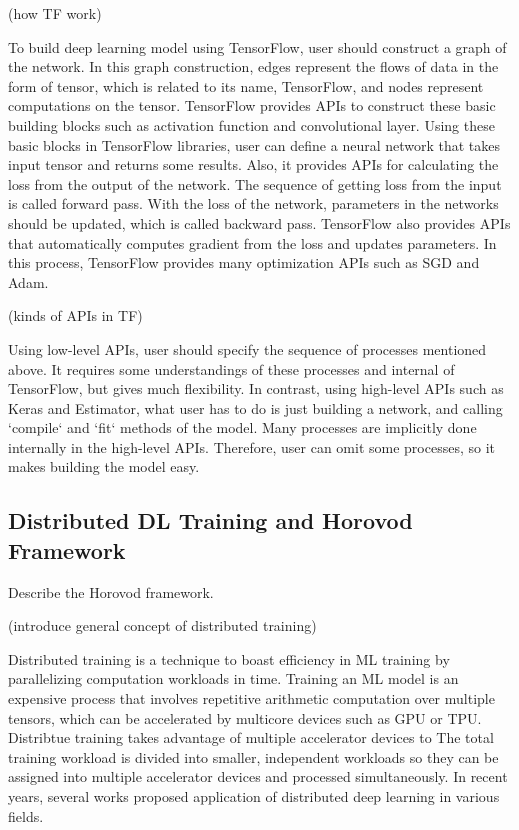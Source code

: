 (how TF work\cite{doi:10.3102/1076998619872761})

To build deep learning model using TensorFlow,
user should construct a graph of the network.
In this graph construction, edges represent the flows of data in the form of tensor,
which is related to its name, TensorFlow,
and nodes represent computations on the tensor.
TensorFlow provides APIs to construct these basic building blocks
such as activation function and convolutional layer.
Using these basic blocks in TensorFlow libraries, user can define a neural network
that takes input tensor and returns some results.
Also, it provides APIs for calculating the loss from the output of the network.
The sequence of getting loss from the input is called forward pass.
With the loss of the network, parameters in the networks should be updated,
which is called backward pass.
TensorFlow also provides APIs that automatically computes gradient from the loss
and updates parameters.
In this process, TensorFlow provides many optimization APIs
such as SGD and Adam.

(kinds of APIs in TF\cite{doi:10.3102/1076998619872761})

Using low-level APIs, user should specify the sequence of processes mentioned above.
It requires some understandings of these processes and internal of TensorFlow,
but gives much flexibility.
In contrast, using high-level APIs such as Keras and Estimator,
what user has to do is just building a network,
and calling `compile` and `fit` methods of the model.
Many processes are implicitly done internally in the high-level APIs.
Therefore, user can omit some processes, so it makes building the model easy.


\subsection{Distributed DL Training and Horovod Framework}
Describe the Horovod framework.

(introduce general concept of distributed training)

Distributed training is a technique to boast efficiency in ML training
by parallelizing computation workloads in time.
Training an ML model is an expensive process that involves repetitive
arithmetic computation over multiple tensors,
which can be accelerated by multicore devices such as GPU or TPU. 
Distribtue training takes advantage of multiple accelerator devices to
The total training workload is divided into smaller, independent workloads
so they can be assigned into multiple accelerator devices and
processed simultaneously. 
In recent years, several works proposed application of distributed
deep learning in various fields.

